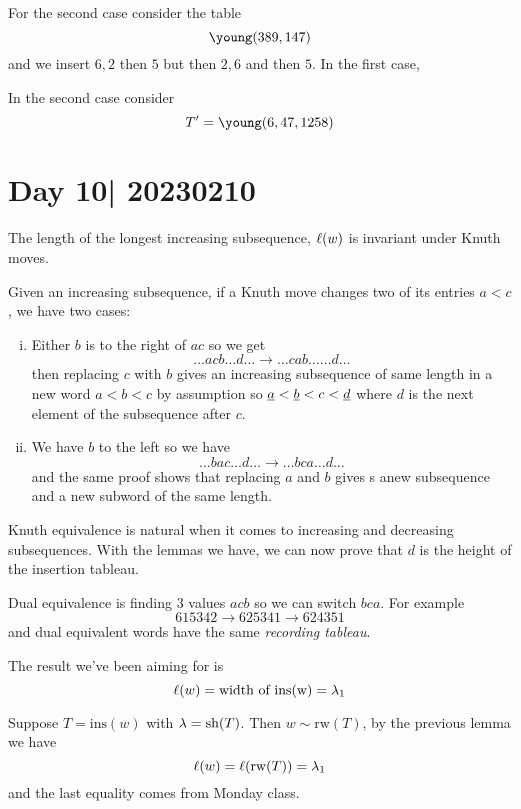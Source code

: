 \documentclass[12pt]{memoir}
\begin{document}
\begin{Ex}
    For the second case consider the table 
$$\young(389,147)$$
and we insert $6,2$ then $5$ but then $2,6$ and then $5$. In the first case, \par 
In the second case consider 
$$T'=\young(6,47,1258)$$
\end{Ex}

\section{Day 10| 20230210}

\begin{Lem}
    The length of the longest increasing subsequence, $\ell(w)$ is invariant under Knuth moves.
\end{Lem}

\begin{ptcbp}
    Given an increasing subsequence, if a Knuth move changes two of its entries $a<c$, we have two cases:
    \begin{enumerate}[i)]
        \itemsep=-0.4em
        \item Either $b$ is to the right of $ac$ so we get 
        $$\dots acb\dots d\dots\to\dots cab\dots\dots d\dots$$
        then replacing $c$ with $b$ gives an increasing subsequence of same length in a new word $a<b<c$ by assumption so $\underline a<\underline b<c<\underline d$ where $d$ is the next element of the subsequence after $c$.
        \item We have $b$ to the left so we have 
        $$\dots bac\dots d\dots\to\dots bca\dots d\dots$$
        and the same proof shows that replacing $a$ and $b$ gives s anew subsequence and a new subword of the same length.
    \end{enumerate}
\end{ptcbp}

Knuth equivalence is natural when it comes to increasing and decreasing subsequences. With the lemmas we have, we can now prove that $d$ is the height of the insertion tableau.

\begin{Rmk}
    Dual equivalence is finding $3$ values $acb$ so we can switch $bca$. For example 
    $$615342\to 625341\to 624351$$
    and dual equivalent words have the same \emph{recording tableau}.
\end{Rmk}

The result we've been aiming for is 
$$\ell(w)=\text{width of }\text{ins(w)}=\lambda_1$$

\begin{ptcbp}
    Suppose $T=\text{ins}(w)$ with $\lambda=\text{sh}(T)$. Then $w\sim\text{rw}(T)$, by the previous lemma we have 
    $$\ell(w)=\ell(\text{rw}(T))=\lambda_1$$
    and the last equality comes from Monday class. 
\end{ptcbp}
\end{document}
